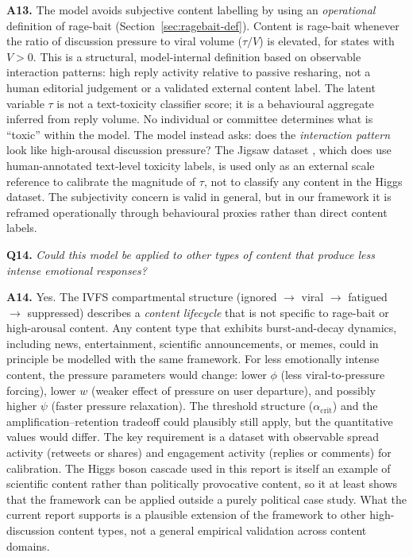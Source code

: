 \documentclass[11pt]{article}
\begin{document}
\medskip
\noindent\textbf{A13.}
The model avoids subjective content labelling by using an \emph{operational} definition of rage-bait (Section~\ref{sec:ragebait-def}).
Content is rage-bait whenever the ratio of discussion pressure to viral volume ($\tau/V$) is elevated, for states with $V>0$.
This is a structural, model-internal definition based on observable interaction patterns: high reply activity relative to passive resharing, not a human editorial judgement or a validated external content label.
The latent variable $\tau$ is not a text-toxicity classifier score; it is a behavioural aggregate inferred from reply volume.
No individual or committee determines what is ``toxic'' within the model. The model instead asks: does the \emph{interaction pattern} look like high-arousal discussion pressure?
The Jigsaw dataset \cite{borkan2019}, which does use human-annotated text-level toxicity labels, is used only as an external scale reference to calibrate the magnitude of $\tau$, not to classify any content in the Higgs dataset.
The subjectivity concern is valid in general, but in our framework it is reframed operationally through behavioural proxies rather than direct content labels.

\bigskip

\noindent\textbf{Q14.} \textit{Could this model be applied to other types of content that produce less intense emotional responses?}

\medskip
\noindent\textbf{A14.}
Yes.
The IVFS compartmental structure (ignored $\to$ viral $\to$ fatigued $\to$ suppressed) describes a \emph{content lifecycle} that is not specific to rage-bait or high-arousal content.
Any content type that exhibits burst-and-decay dynamics, including news, entertainment, scientific announcements, or memes, could in principle be modelled with the same framework.
For less emotionally intense content, the pressure parameters would change: lower $\phi$ (less viral-to-pressure forcing), lower $w$ (weaker effect of pressure on user departure), and possibly higher $\psi$ (faster pressure relaxation).
The threshold structure ($\alpha_{\mathrm{crit}}$) and the amplification--retention tradeoff could plausibly still apply, but the quantitative values would differ.
The key requirement is a dataset with observable spread activity (retweets or shares) and engagement activity (replies or comments) for calibration.
The Higgs boson cascade used in this report is itself an example of scientific content rather than politically provocative content, so it at least shows that the framework can be applied outside a purely political case study.
What the current report supports is a plausible extension of the framework to other high-discussion content types, not a general empirical validation across content domains.
\end{document}
